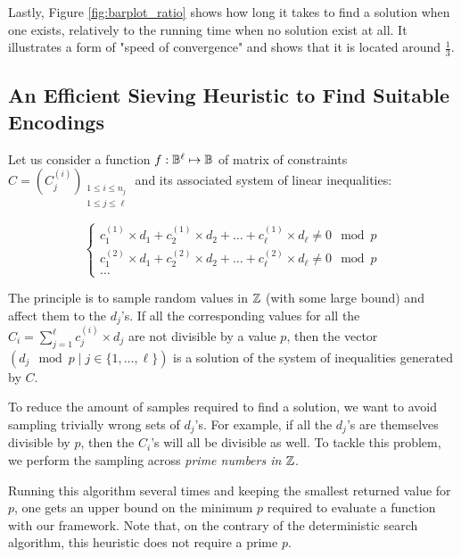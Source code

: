 Lastly, Figure \ref{fig:barplot_ratio} shows how long it takes to find a solution when one exists, relatively to the running time when no solution exist at all. It illustrates a form of "speed of convergence" and shows that it is located around $\frac{1}{3}$.



    
\subsection{An Efficient Sieving Heuristic to Find Suitable Encodings}
\label{sec:heuristic_matthieu}


Let us consider a function $f: \mathbb{B}^\ell \mapsto \mathbb{B}$ of matrix of constraints $C=(C_j^{(i)})_{\substack{1 \le i \le n_j\\1 \le j \le \ell}}$ and its associated system of linear inequalities:

$$
\left \{
\begin{array}{c}
     c_1^{(1)} \times d_1 + c_2^{(1)} \times d_2 + \dots + c_\ell^{(1)} \times d_\ell   \neq 0 \mod p\\
     c_1^{(2)} \times d_1 + c_2^{(2)} \times d_2 + \dots + c_\ell^{(2)} \times d_\ell \neq 0 \mod p\\
    \dots
\end{array}
\right .
$$


The principle is to sample random values in $\mathbb{Z}$ (with some large bound) and affect them to the $d_j$'s. If all the corresponding values for all the $C_i = \sum_{j=1}^{\ell} c_j^{(i)} \times d_j$ are not divisible by a value $p$, then the vector $(d_j \mod p \mid j \in \{1, \dots, \ell\})$ is a solution of the system of inequalities generated by $C$. 


To reduce the amount of samples required to find a solution, we want to avoid sampling trivially wrong sets of $d_j$'s. For example, if all the $d_j$'s are themselves divisible by $p$, then the $C_i$'s will all be divisible as well. To tackle this problem, we perform the sampling across \emph{prime numbers in $\mathbb{Z}$}.






Running this algorithm several times and keeping the smallest returned value for $p$, one gets an upper bound on the minimum $p$ required to evaluate a function with our framework. Note that, on the contrary of the deterministic search algorithm, this heuristic does not require a prime $p$.


